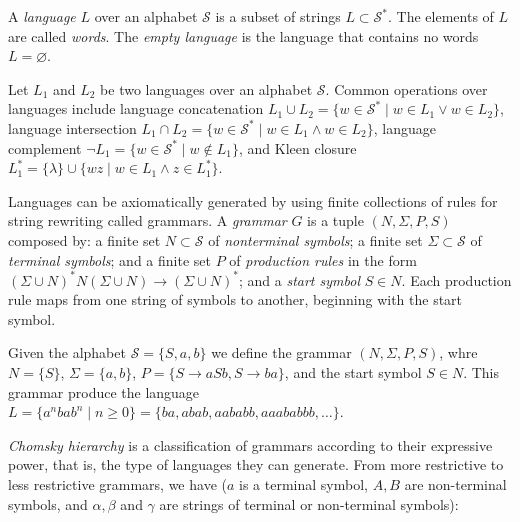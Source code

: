 A \emph{language} $L$ over an alphabet $\mathcal{S}$ is a subset of strings $L \subset \mathcal{S}^{\ast}$. The elements of $L$ are called \emph{words}. The \emph{empty language} is the language that contains no words $L = \varnothing$. 

Let $L_1$ and $L_2$ be two languages over an alphabet $\mathcal{S}$. Common operations over languages include language concatenation $L_1 \cup L_2 = \{ w \in \mathcal{S}^{\ast} \mid w \in L_1 \lor w \in L_2 \}$, language intersection $L_1 \cap L_2 = \{ w \in \mathcal{S}^{\ast} \mid w \in L_1 \land w \in L_2 \}$, language complement $\lnot L_1 = \{ w \in \mathcal{S}^{\ast} \mid w \notin L_1 \}$, and Kleen closure $L_1^\ast = \{ \lambda \} \cup \{ wz \mid w \in L_1 \land z \in L_1^\ast \}$. 

Languages can be axiomatically generated by using finite collections of rules for string rewriting called grammars. A \emph{grammar} $G$ is a tuple $(N, \Sigma, P, S)$ composed by: a finite set $N \subset \mathcal{S}$ of \emph{nonterminal symbols}; a finite set $\Sigma \subset \mathcal{S}$ of \emph{terminal symbols}; and a finite set $P$ of \emph{production rules} in the form $( \Sigma \cup N )^\ast N ( \Sigma \cup N) \rightarrow (\Sigma \cup N)^\ast$; and a \emph{start symbol} $S \in N$. Each production rule maps from one string of symbols to another, beginning with the start symbol.

\begin{example}
\label{ex:context_free_grammar}
Given the alphabet $\mathcal{S} = \{ S, a, b \}$ we define the grammar $(N, \Sigma, P, S)$, whre $N = \{ S \}$, $\Sigma = \{ a, b \}$, $P = \{ S \rightarrow aSb, S \rightarrow ba \}$, and the start symbol $S \in N$. This grammar produce the language $L = \{ a^nbab^n \mid n\geq0 \} = \{ ba, abab, aababb, aaababbb, \ldots \}$.
\end{example}

\emph{Chomsky hierarchy} is a classification of grammars according to their expressive power, that is, the type of languages they can generate. From more restrictive to less restrictive grammars, we have ($a$ is a terminal symbol, $A, B$ are non-terminal symbols, and $\alpha, \beta$ and $\gamma$ are strings of terminal or non-terminal symbols):

